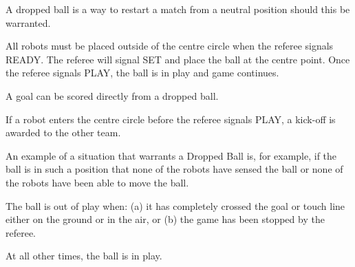 \documentclass[12pt]{hurocup}
\begin{document}

\begin{lawlist}[US]
  \item A dropped ball is a way to restart a match from a neutral
    position should this be warranted.

  \item All robots must be placed outside of the centre circle when
    the referee signals READY. The referee will signal SET and place
    the ball at the centre point. Once the referee signals PLAY, the
    ball is in play and game continues.

  \item A goal can be scored directly from a dropped ball.

  \item If a robot enters the centre circle before the referee signals
    PLAY, a kick-off is awarded to the other team.
\end{lawlist}

\begin{decisions}
\item An example of a situation that warrants a Dropped Ball is, for
  example, if the ball is in such a position that none of the robots
  have sensed the ball or none of the robots have been able to move
  the ball.
\end{decisions}


\begin{lawlist}[US]
\item The ball is out of play when: (a) it has completely crossed the
  goal or touch line either on the ground or in the air, or (b) the
  game has been stopped by the referee.

\item At all other times, the ball is in play.
\end{lawlist}

\label{law:scoring}
\end{document}
